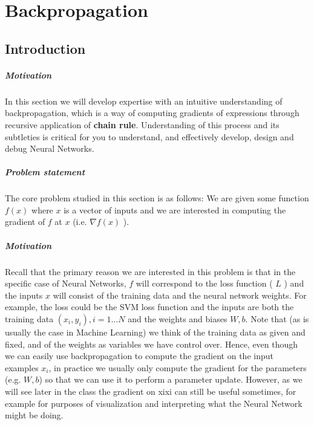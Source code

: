 \chapter{Backpropagation}

\section*{Introduction}

\paragraph*{Motivation} In this section we will develop expertise with an intuitive understanding of backpropagation, which is a way of computing gradients of expressions through recursive application of \textbf{chain rule}. Understanding of this process and its subtleties is critical for you to understand, and effectively develop, design and debug Neural Networks.

\paragraph*{Problem statement} The core problem studied in this section is as follows: We are given some function $f(x)$ where $x$ is a vector of inputs and we are interested in computing the gradient of $f$ at $x$ (i.e. $\nabla f(x)$ ).

\paragraph*{Motivation} Recall that the primary reason we are interested in this problem is that in the specific case of Neural Networks, $f$ will correspond to the loss function ( $L$ ) and the inputs $x$ will consist of the training data and the neural network weights. For example, the loss could be the SVM loss function and the inputs are both the training data $(x_i,y_i), i=1 \ldots N$ and the weights and biases $W,b$. Note that (as is usually the case in Machine Learning) we think of the training data as given and fixed, and of the weights as variables we have control over. Hence, even though we can easily use backpropagation to compute the gradient on the input examples $x_i$, in practice we usually only compute the gradient for the parameters (e.g. $W,b$) so that we can use it to perform a parameter update. However, as we will see later in the class the gradient on xixi can still be useful sometimes, for example for purposes of visualization and interpreting what the Neural Network might be doing.

